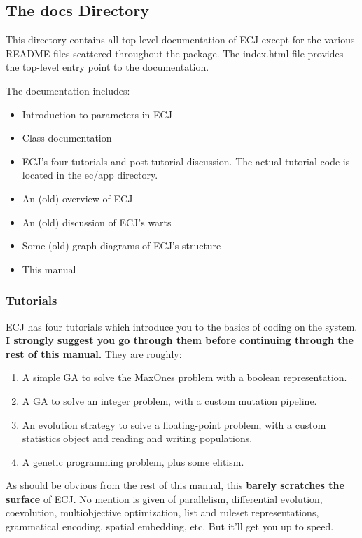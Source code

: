 \documentclass[twoside,10pt]{book}
\newcommand\file[1]{\index{#1}\textsf{#1}}
\begin{document}
\subsection{The \file{docs} Directory}

This directory contains all top-level documentation of ECJ except for the various README files scattered throughout the package.  The \file{index.html} file provides the top-level entry point to the documentation.

The documentation includes:

\begin{itemize}
\item Introduction to parameters in ECJ
\item Class documentation
\item ECJ's four tutorials and post-tutorial discussion.  The actual tutorial code is located in the \file{ec/app} directory.
\item An (old) overview of ECJ
\item An (old) discussion of ECJ's warts
\item Some (old) graph diagrams of ECJ's structure
\item This manual
\end{itemize}

\subsubsection{Tutorials}

ECJ has four tutorials which introduce you to the basics of coding on the system.  {\bf I strongly suggest you go through them before continuing through the rest of this manual.}  They are roughly:

\begin{enumerate}
\item A simple GA to solve the MaxOnes problem with a boolean representation.
\item A GA to solve an integer problem, with a custom mutation pipeline.
\item An evolution strategy to solve a floating-point problem, with a custom statistics object and reading and writing populations.
\item A genetic programming problem, plus some elitism.
\end{enumerate}

As should be obvious from the rest of this manual, this {\bf barely scratches the surface} of ECJ.  No mention is given of parallelism, differential evolution, coevolution, multiobjective optimization, list and ruleset representations, grammatical encoding, spatial embedding, etc.  But it'll get you up to speed.
\end{document}
